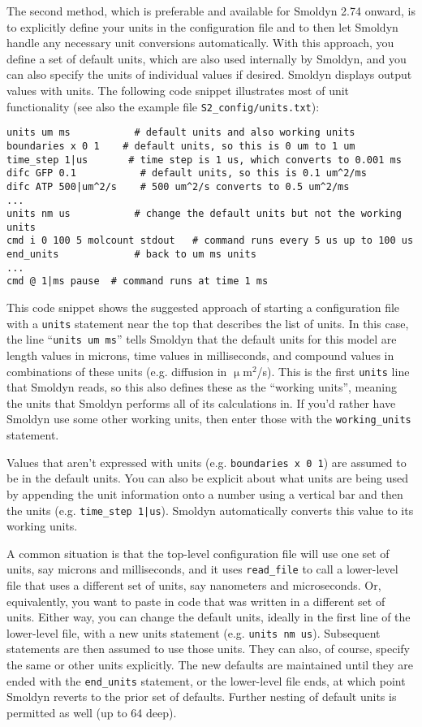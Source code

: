 \documentclass {scrbook}
\newcommand {\ttt} {\texttt}
\begin{document}
The second method, which is preferable and available for Smoldyn 2.74 onward, is to explicitly define your units in the configuration file and to then let Smoldyn handle any necessary unit conversions automatically. With this approach, you define a set of default units, which are also used internally by Smoldyn, and you can also specify the units of individual values if desired. Smoldyn displays output values with units. The following code snippet illustrates most of unit functionality (see also the example file \ttt{S2\_config/units.txt}):

\begin{lstlisting}[style=SSAC]
units um ms           # default units and also working units
boundaries x 0 1    # default units, so this is 0 um to 1 um
time_step 1|us       # time step is 1 us, which converts to 0.001 ms
difc GFP 0.1           # default units, so this is 0.1 um^2/ms
difc ATP 500|um^2/s    # 500 um^2/s converts to 0.5 um^2/ms
...
units nm us           # change the default units but not the working units
cmd i 0 100 5 molcount stdout   # command runs every 5 us up to 100 us
end_units             # back to um ms units
...
cmd @ 1|ms pause  # command runs at time 1 ms
\end{lstlisting}

This code snippet shows the suggested approach of starting a configuration file with a \ttt{units} statement near the top that describes the list of units. In this case, the line ``\ttt{units um ms}'' tells Smoldyn that the default units for this model are length values in microns, time values in milliseconds, and compound values in combinations of these units (e.g. diffusion in $\upmu$m$^2$/s). This is the first \ttt{units} line that Smoldyn reads, so this also defines these as the ``working units'', meaning the units that Smoldyn performs all of its calculations in. If you'd rather have Smoldyn use some other working units, then enter those with the \ttt{working\_units} statement.

Values that aren't expressed with units (e.g. \ttt{boundaries x 0 1}) are assumed to be in the default units. You can also be explicit about what units are being used by appending the unit information onto a number using a vertical bar and then the units (e.g. \ttt{time\_step 1|us}). Smoldyn automatically converts this value to its working units.

A common situation is that the top-level configuration file will use one set of units, say microns and milliseconds, and it uses \ttt{read\_file} to call a lower-level file that uses a different set of units, say nanometers and microseconds. Or, equivalently, you want to paste in code that was written in a different set of units. Either way, you can change the default units, ideally in the first line of the lower-level file, with a new units statement (e.g. \ttt{units nm us}). Subsequent statements are then assumed to use those units. They can also, of course, specify the same or other units explicitly. The new defaults are maintained until they are ended with the \ttt{end\_units} statement, or the lower-level file ends, at which point Smoldyn reverts to the prior set of defaults. Further nesting of default units is permitted as well (up to 64 deep).
\end{document}
